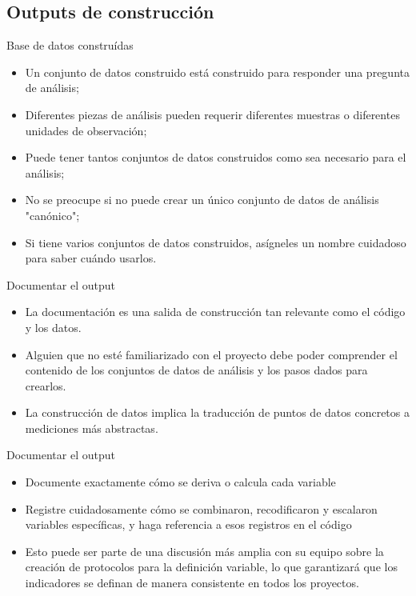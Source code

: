 \documentclass[10pt, aspectratio=169, compress]{beamer}
\makeatletter
\def\beamer@writeslidentry@miniframesoff{%
	\expandafter\beamer@ifempty\expandafter{\beamer@framestartpage}{}%
	{%
		\clearpage\beamer@notesactions%
	}
}
\newcommand*{\miniframesoff}{\let\beamer@writeslidentry=\beamer@writeslidentry@miniframesoff}
\makeatother
\begin{document}
\subsection{Outputs de construcción}
\begin{frame}{Base de datos construídas}
	\begin{itemize}
		\item Un conjunto de datos construido está construido para responder una pregunta de análisis;
		\item Diferentes piezas de análisis pueden requerir diferentes muestras o diferentes unidades de observación;
		\item Puede tener tantos conjuntos de datos construidos como sea necesario para el análisis;
		\item No se preocupe si no puede crear un único conjunto de datos de análisis "canónico";
		\item Si tiene varios conjuntos de datos construidos, asígneles un nombre cuidadoso para saber cuándo usarlos.
	\end{itemize}
\end{frame}
\begin{frame}[<+->]{Documentar el output}
	\begin{itemize}
		\item La documentación es una salida de construcción tan relevante como el código y los datos.
		\item Alguien que no esté familiarizado con el proyecto debe poder comprender el contenido de los conjuntos de datos de análisis y los pasos dados para crearlos.
		\item La construcción de datos implica la traducción de puntos de datos concretos a mediciones más abstractas.
	\end{itemize}
\end{frame}
\begin{frame}[<+->]{Documentar el output}
	\begin{itemize}
		\item Documente exactamente cómo se deriva o calcula cada variable
		\item Registre cuidadosamente cómo se combinaron, recodificaron y escalaron variables específicas, y haga referencia a esos registros en el código
		\item Esto puede ser parte de una discusión más amplia con su equipo sobre la creación de protocolos para la definición variable, lo que garantizará que los indicadores se definan de manera consistente en todos los proyectos.
	\end{itemize}
\end{frame}
\miniframesoff 	
\end{document}
